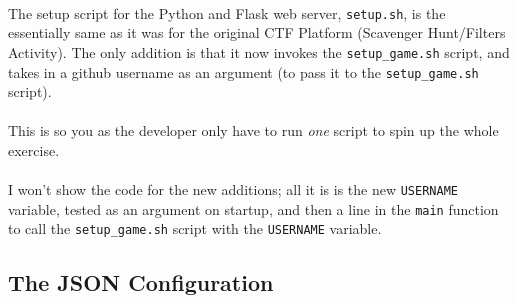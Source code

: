 \documentclass[11pt]{article}
\begin{document}
	\paragraph{} The setup script for the Python and Flask web server, \texttt{setup.sh}, is the essentially same as it was for the original CTF Platform (Scavenger Hunt/Filters Activity). The only addition is that it now invokes the \texttt{setup\_game.sh} script, and takes in a github username as an argument (to pass it to the \texttt{setup\_game.sh} script).

	\paragraph{} This is so you as the developer only have to run \textit{one} script to spin up the whole exercise. 

	\paragraph{} I won't show the code for the new additions; all it is is the new \texttt{USERNAME} variable, tested as an argument on startup, and then a line in the \texttt{main} function to call the \texttt{setup\_game.sh} script with the \texttt{USERNAME} variable. \\


	\begin{center}
		\graphicspath{ {.} }
		\centering
	\end{center}

	\newpage

	\subsection{The JSON Configuration}
\end{document}
